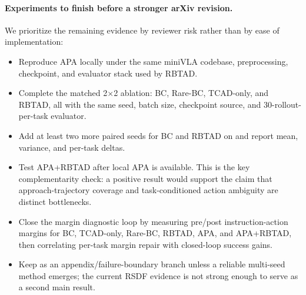 \paragraph{Experiments to finish before a stronger arXiv revision.}
We prioritize the remaining evidence by reviewer risk rather than by ease of implementation:
\begin{itemize}[leftmargin=*]
  \item Reproduce APA locally under the same miniVLA codebase, preprocessing, checkpoint, and evaluator stack used by RBTAD.
  \item Complete the matched \liberocorelt{} 2$\times$2 ablation: BC, Rare-BC, TCAD-only, and RBTAD, all with the same seed, batch size, checkpoint source, and 30-rollout-per-task evaluator.
  \item Add at least two more paired seeds for BC and RBTAD on \liberocorelt{} and report mean, variance, and per-task deltas.
  \item Test APA+RBTAD after local APA is available. This is the key complementarity check: a positive result would support the claim that approach-trajectory coverage and task-conditioned action ambiguity are distinct bottlenecks.
  \item Close the margin diagnostic loop by measuring pre/post instruction-action margins for BC, TCAD-only, Rare-BC, RBTAD, APA, and APA+RBTAD, then correlating per-task margin repair with closed-loop success gains.
  \item Keep \liberospatiallt{} as an appendix/failure-boundary branch unless a reliable multi-seed method emerges; the current RSDF evidence is not strong enough to serve as a second main result.
\end{itemize}

